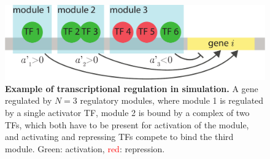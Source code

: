 
\begin{figure}[ht]
  \centering
  \includegraphics[width=\textwidth]{theory/fig/GeneWeaverRegulation.pdf}
   \caption{\textbf{Example of transcriptional regulation in simulation.}
    A gene regulated by $N=3$ regulatory modules, where module 1 is regulated by a single activator TF, module 2 is bound by a complex of two TFs, which both have to be present for activation of the module, and activating and repressing TFs compete to bind the third module. \textcolor{OliveGreen}{Green}: activation, \textcolor{red}{red}: repression.} 
  \label{fig:gnw_regulation}
\end{figure}


